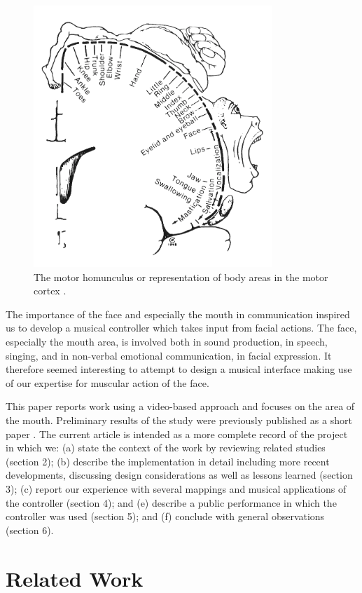 \begin{figure}[t]
\centering
\includegraphics[width=90mm]{lyons_fig1}
\caption{The motor homunculus or representation of body areas in the motor cortex \cite{Penfield:1950}.}
\label{lyons-fig:1} 
\end{figure}

The importance of the face and especially the mouth in communication inspired us to develop a musical controller which takes input from facial actions. The face, especially the mouth area, is involved both in sound production, in speech, singing, and in non-verbal emotional communication, in facial expression. It therefore seemed interesting to attempt to design a musical interface making use of our expertise for muscular action of the face.

This paper reports work using a video-based approach and focuses on the area of the mouth.  Preliminary results of the study were previously published as a short paper \cite{Lyons:2001}. The current article is intended as a more complete record of the project in which we: (a) state the context of the work by reviewing related studies (section 2); (b) describe the implementation in detail including more recent developments, discussing design considerations as well as lessons learned (section 3); (c) report our experience with several mappings and musical applications of the controller (section 4); and (e) describe a public performance in which the controller was used (section 5); and (f) conclude with general observations (section 6).

\section{Related Work}

